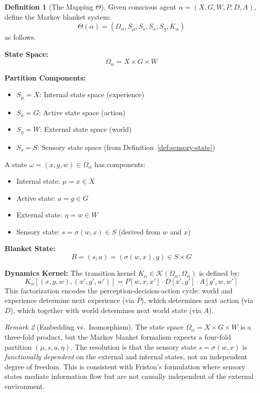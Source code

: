 \documentclass[11pt,a4paper]{article}
\theoremstyle{definition}
\newtheorem{definition}{Definition}[section]
\theoremstyle{plain}
\theoremstyle{remark}
\newtheorem{remark}[definition]{Remark}
\begin{document}
\begin{definition}[The Mapping $\Theta$]\label{def:theta}
Given conscious agent $\alpha = (X, G, W, P, D, A)$, define the Markov blanket system:
\[
\Theta(\alpha) = (\Omega_\alpha, S_{\mu}, S_s, S_a, S_{\eta}, K_\alpha)
\]
as follows.

\textbf{State Space:}
\[
\Omega_\alpha = X \times G \times W
\]

\textbf{Partition Components:}
\begin{itemize}
    \item $S_\mu = X$: Internal state space (experience)
    \item $S_a = G$: Active state space (action)
    \item $S_\eta = W$: External state space (world)
    \item $S_s = S$: Sensory state space (from Definition~\ref{def:sensory-state})
\end{itemize}

A state $\omega = (x, g, w) \in \Omega_\alpha$ has components:
\begin{itemize}
    \item Internal state: $\mu = x \in X$
    \item Active state: $a = g \in G$
    \item External state: $\eta = w \in W$
    \item Sensory state: $s = \sigma(w, x) \in S$ (derived from $w$ and $x$)
\end{itemize}

\textbf{Blanket State:}
\[
B = (s, a) = (\sigma(w, x), g) \in S \times G
\]

\textbf{Dynamics Kernel:}
The transition kernel $K_\alpha \in \mathcal{K}(\Omega_\alpha, \Omega_\alpha)$ is defined by:
\begin{equation}\label{eq:theta-kernel}
K_\alpha[(x, g, w), (x', g', w')] = P[w, x, x'] \cdot D[x', g'] \cdot A[g', w, w']
\end{equation}
This factorization encodes the perception-decision-action cycle: world and experience determine next experience (via $P$), which determines next action (via $D$), which together with world determines next world state (via $A$).
\end{definition}

\begin{remark}[Embedding vs.\ Isomorphism]
The state space $\Omega_\alpha = X \times G \times W$ is a three-fold product, but the Markov blanket formalism expects a four-fold partition $(\mu, s, a, \eta)$. The resolution is that the sensory state $s = \sigma(w, x)$ is \emph{functionally dependent} on the external and internal states, not an independent degree of freedom. This is consistent with Friston's formulation where sensory states mediate information flow but are not causally independent of the external environment.
\end{remark}
\end{document}
